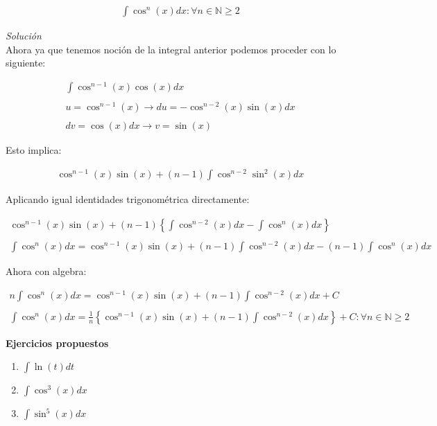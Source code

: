 \vspace{1cm}
\begin{equation}
    \begin{gathered}
        \int \cos^{n}(x)dx \colon \forall n\in\mathbb{N}\geq 2
    \end{gathered}
\end{equation}

\textit{Solución}\\

Ahora ya que tenemos noción de la integral anterior podemos proceder con lo siguiente:

\begin{equation*}
    \begin{gathered}
        \int\cos^{n-1}(x)\cos(x)dx\\\\
        u=\cos^{n-1}(x)\rightarrow du=-\cos^{n-2}(x)\sin(x)dx\\\\
        dv=\cos(x)dx \rightarrow v=\sin(x)
    \end{gathered}
\end{equation*}

Esto implica:

\begin{equation*}
    \begin{gathered}
        \cos^{n-1}(x)\sin(x)+(n-1)\int\cos^{n-2}\sin^{2}(x)dx
    \end{gathered}
\end{equation*}

Aplicando igual identidades trigonométrica directamente:

\begin{equation*}
    \begin{gathered}
        \cos^{n-1}(x)\sin(x)+(n-1)\left\{\int\cos^{n-2}(x)dx - \int\cos^{n}(x)dx\right\}\\\\
        \int\cos^{n}(x)dx =\cos^{n-1}(x)\sin(x)+(n-1)\int\cos^{n-2}(x)dx-(n-1)\int\cos^{n}(x)dx\
    \end{gathered}
\end{equation*}

Ahora con algebra:

\begin{equation*}
    \begin{gathered}
        n\int\cos^{n}(x)dx =\cos^{n-1}(x)\sin(x)+(n-1)\int\cos^{n-2}(x)dx+C\\\\
        \int\cos^{n}(x)dx =\frac{1}{n}\left\{\cos^{n-1}(x)\sin(x)+(n-1)\int\cos^{n-2}(x)dx\right\}+C \colon \forall n\in\mathbb{N}\geq 2
    \end{gathered}
\end{equation*}

\textbf{Ejercicios propuestos}

\begin{enumerate}
  \item \(\displaystyle\int\ln(t)dt\)
  \item \(\displaystyle\int \cos^{3}(x)dx\)
  \item \(\displaystyle\int \sin^{5}(x)dx\)
\end{enumerate}
